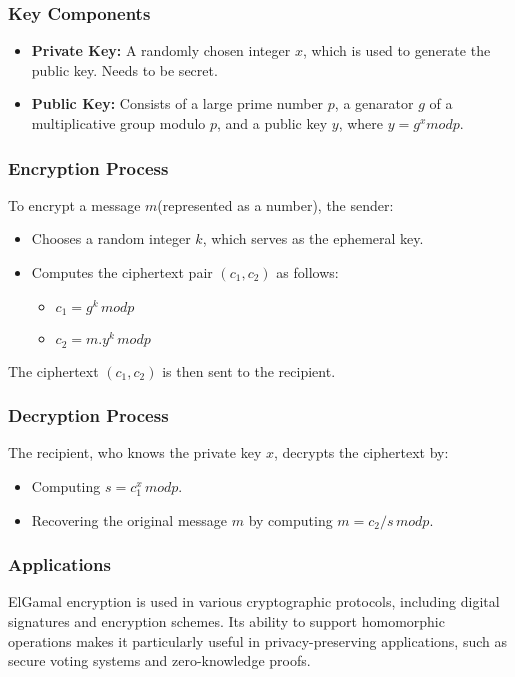 \documentclass[12pt,a4paper]{report}
\begin{document}
\subsubsection{Key Components}
\begin{itemize}
	\item \textbf{Private Key:} A randomly chosen integer $x$, which is used to generate the public key. Needs to be secret.
	\item \textbf{Public Key:} Consists of a large prime number $p$, a genarator $g$ of a multiplicative group modulo $p$, and a public key $y$, where $y = g^x mod p$.
\end{itemize}
\subsubsection{Encryption Process}
To encrypt a message $m$(represented as a number), the sender:
\begin{itemize}
	\item Chooses a random integer $k$, which serves as the ephemeral key.
	\item Computes the ciphertext pair $(c_1, c_2)$ as follows:
		\begin{itemize}
			\item $c_1 = g^k\, mod p$
			\item $c_2 = m . y^k\, mod p$
		\end{itemize}
\end{itemize}
The ciphertext $(c_1, c_2)$ is then sent to the recipient.
\subsubsection{Decryption Process}
The recipient, who knows the private key $x$, decrypts the ciphertext by:
\begin{itemize}
	\item Computing $s = c_{1}^{x}\, mod p$.
	\item Recovering the original message $m$ by computing $m = c_2 / s\, mod p$.
\end{itemize}
\subsubsection{Applications}
ElGamal encryption is used in various cryptographic protocols, including digital signatures and encryption schemes. 
Its ability to support homomorphic operations makes it particularly useful in privacy-preserving applications, 
such as secure voting systems and zero-knowledge proofs.
\end{document}
